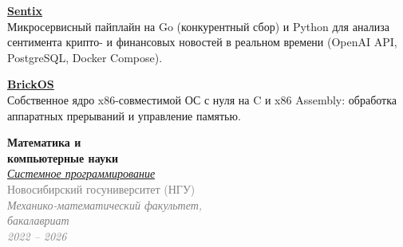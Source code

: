 \documentclass[10pt, a4paper]{article}
\begin{document}
\begin{minipage}[t]{0.4\textwidth}


\hspace{0.5cm}
\begin{minipage}[t]{0.9\textwidth}
    \raggedright
    \textbf{\Large \href{https://github.com/Isn0v/Sentix}{Sentix}\extlink}  \\[2pt]
    Микросервисный пайплайн на Go (конкурентный сбор) и Python для анализа сентимента крипто- и финансовых новостей в реальном времени (OpenAI API, PostgreSQL, Docker Compose). \\
\end{minipage}

\vspace{0.4cm}

\hspace{0.5cm}
\begin{minipage}[t]{0.9\textwidth}
    \raggedright
    \textbf{\Large \href{https://github.com/B0GDANPN/BrickOS/tree/main}{BrickOS}\extlink}  \\[2pt]
    Собственное ядро x86-совместимой ОС с нуля на C и x86 Assembly: обработка аппаратных прерываний и управление памятью.
\end{minipage}


\begin{minipage}[t]{\textwidth}
    \raggedright
    \textbf{\Large Математика и \\компьютерные науки} \\[2pt]
    \textit{\large \href{https://education.nsu.ru/syspro/}{Системное программирование} \extlink} \\[4pt]
    \textcolor{graytext}{Новосибирский госуниверситет (НГУ)} \\
    \textcolor{graytext}{\textit{Механико-математический факультет, \\бакалавриат}\\ \textit{2022 -- 2026}}
\end{minipage}


\end{minipage}
\end{document}
